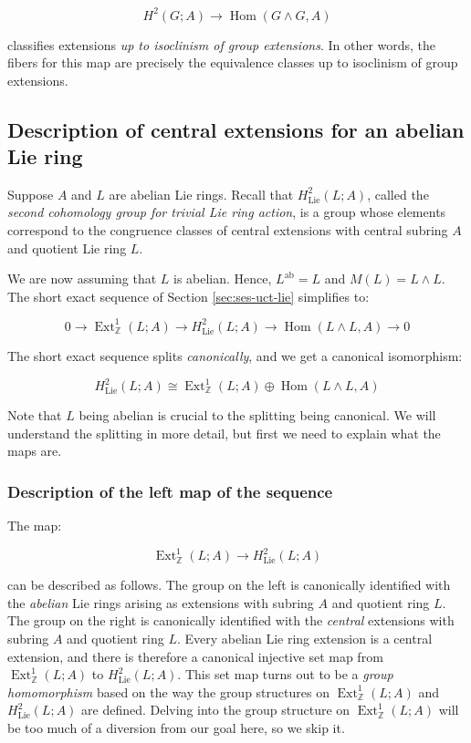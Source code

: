 \documentclass{ucetd}
\begin{document}
$$H^2(G;A) \to \operatorname{Hom}(G \wedge G,A)$$

classifies extensions {\em up to isoclinism of group extensions}. In
other words, the fibers for this map are precisely the equivalence
classes up to isoclinism of group extensions.

\subsection{Description of central extensions for an abelian Lie ring}\label{sec:ses-uct-lie-abelian}

Suppose $A$ and $L$ are abelian Lie rings. Recall that
$H^2_{\text{Lie}}(L;A)$, called the {\em second cohomology group for
  trivial Lie ring action}, is a group whose elements correspond to
the congruence classes of central extensions with central subring $A$
and quotient Lie ring $L$.

We are now assuming that $L$ is abelian. Hence, $L^{\operatorname{ab}}
= L$ and $M(L) = L \wedge L$. The short exact sequence of Section
\ref{sec:ses-uct-lie} simplifies to:

\begin{equation}\label{eq:ses-uct-lie-abelian}
0 \to \operatorname{Ext}^1_{\mathbb{Z}}(L;A) \to H^2_{\text{Lie}}(L;A) \to \operatorname{Hom}(L \wedge L, A) \to 0
\end{equation}

The short exact sequence splits {\em canonically}, and we get a
canonical isomorphism:

$$H^2_{\text{Lie}}(L;A) \cong \operatorname{Ext}^1_{\mathbb{Z}}(L;A) \oplus \operatorname{Hom}(L \wedge L,A)$$

Note that $L$ being abelian is crucial to the splitting being
canonical. We will understand the splitting in more detail, but first we need to explain what the maps are.

\subsubsection{Description of the left map of the sequence}\label{sec:ses-uct-lie-abelian-left-map}

The map:

$$\operatorname{Ext}^1_{\mathbb{Z}}(L;A) \to H^2_{\text{Lie}}(L;A)$$

can be described as follows. The group on the left is canonically
identified with the {\em abelian} Lie rings arising as extensions with
subring $A$ and quotient ring $L$. The group on the right is
canonically identified with the {\em central} extensions with subring
$A$ and quotient ring $L$. Every abelian Lie ring extension is a
central extension, and there is therefore a canonical injective set
map from $\operatorname{Ext}^1_{\mathbb{Z}}(L;A)$ to $H^2_{\text{Lie}}(L;A)$. This
set map turns out to be a {\em group homomorphism} based on the way
the group structures on $\operatorname{Ext}^1_{\mathbb{Z}}(L;A)$ and
$H^2_{\text{Lie}}(L;A)$ are defined. Delving into the group structure on
$\operatorname{Ext}^1_{\mathbb{Z}}(L;A)$ will be too much of a
diversion from our goal here, so we skip it.
\end{document}
